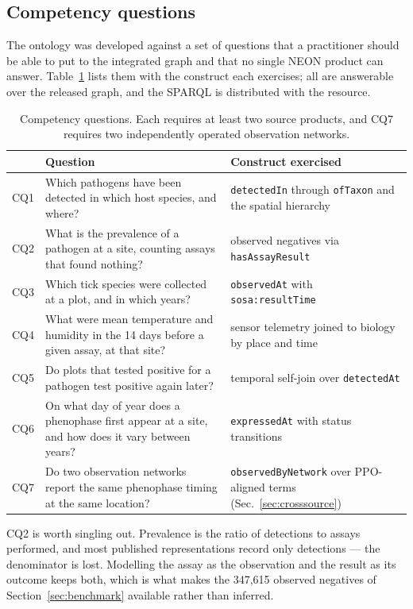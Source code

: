 \subsection{Competency questions}
\label{sec:cq}

The ontology was developed against a set of questions that a practitioner
should be able to put to the integrated graph and that no single NEON product
can answer. Table~\ref{tab:cq} lists them with the construct each exercises;
all are answerable over the released graph, and the SPARQL is distributed with
the resource.

\begin{table}[t]
\centering
\caption{Competency questions. Each requires at least two source products, and
CQ7 requires two independently operated observation networks.}
\label{tab:cq}
\small
\begin{tabular}{llp{5.4cm}}
\toprule
& \textbf{Question} & \textbf{Construct exercised} \\
\midrule
CQ1 & Which pathogens have been detected in which host species, and where?
    & \texttt{detectedIn} through \texttt{ofTaxon} and the spatial hierarchy \\
CQ2 & What is the prevalence of a pathogen at a site, counting assays that
      found nothing? & observed negatives via \texttt{hasAssayResult} \\
CQ3 & Which tick species were collected at a plot, and in which years?
    & \texttt{observedAt} with \texttt{sosa:resultTime} \\
CQ4 & What were mean temperature and humidity in the 14 days before a given
      assay, at that site? & sensor telemetry joined to biology by place and
      time \\
CQ5 & Do plots that tested positive for a pathogen test positive again later?
    & temporal self-join over \texttt{detectedAt} \\
CQ6 & On what day of year does a phenophase first appear at a site, and how
      does it vary between years? & \texttt{expressedAt} with status
      transitions \\
CQ7 & Do two observation networks report the same phenophase timing at the
      same location? & \texttt{observedByNetwork} over PPO-aligned terms
      (Sec.~\ref{sec:crosssource}) \\
\bottomrule
\end{tabular}
\end{table}

CQ2 is worth singling out. Prevalence is the ratio of detections to assays
performed, and most published representations record only detections --- the
denominator is lost. Modelling the assay as the observation and the result as
its outcome keeps both, which is what makes the 347{,}615 observed negatives of
Section~\ref{sec:benchmark} available rather than inferred.

